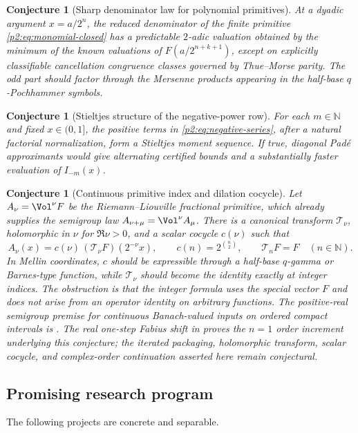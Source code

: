 \documentclass[11pt,oneside]{article}
\newtheorem{conjecture}[theorem]{Conjecture}
\theoremstyle{definition}
\theoremstyle{remark}
\newcommand{\N}{\mathbb N}
\newcommand{\1}{\mathbf 1}
\begin{document}
\begin{conjecture}[Sharp denominator law for polynomial primitives]
\label{p2:conj:denominator}
At a dyadic argument $x=a/2^n$, the reduced denominator of the finite primitive
\eqref{p2:eq:monomial-closed} has a predictable $2$-adic valuation obtained by the
minimum of the known valuations of
$F(a/2^{n+k+1})$, except on explicitly classifiable cancellation congruence
classes governed by Thue--Morse parity.  The odd part should factor through the
Mersenne products appearing in the half-base $q$-Pochhammer symbols.
\end{conjecture}

\begin{conjecture}[Stieltjes structure of the negative-power row]
\label{p2:conj:stieltjes}
For each $m\in\N$ and fixed $x\in(0,1]$, the positive terms in
\eqref{p2:eq:negative-series}, after a natural factorial normalization, form a
Stieltjes moment sequence.  If true, diagonal Pad\'e approximants would give
alternating certified bounds and a substantially faster evaluation of
$I_{-m}(x)$.
\end{conjecture}

\begin{conjecture}[Continuous primitive index and dilation cocycle]
\label{p2:conj:fractional-index}
Let $A_\nu=\Vol^\nu F$ be the Riemann--Liouville fractional primitive, which
already supplies the semigroup law $A_{\nu+\mu}=\Vol^\nu A_\mu$.  There is a
canonical transform $\mathscr T_\nu$, holomorphic in $\nu$ for $\Re\nu>0$, and
a scalar cocycle $c(\nu)$ such that
\[
 A_\nu(x)=c(\nu)\,(\mathscr T_\nu F)(2^{-\nu}x),
 \qquad c(n)=2^{\binom n2},\qquad \mathscr T_nF=F
 \quad(n\in\N).
\]
In Mellin coordinates, $c$ should be expressible through a half-base
$q$-gamma or Barnes-type function, while $\mathscr T_\nu$ should become the
identity exactly at integer indices.  The obstruction is that the integer
formula uses the special vector $F$ and does not arise from an operator
identity on arbitrary functions.
The positive-real semigroup premise for continuous Banach-valued inputs on ordered compact
intervals is .  The real one-step Fabius shift in
 proves the $n=1$ order increment underlying
this conjecture; the iterated packaging, holomorphic transform, scalar cocycle, and
complex-order continuation asserted here remain conjectural.
\end{conjecture}

\subsection{Promising research program}
The following projects are concrete and separable.
\end{document}
